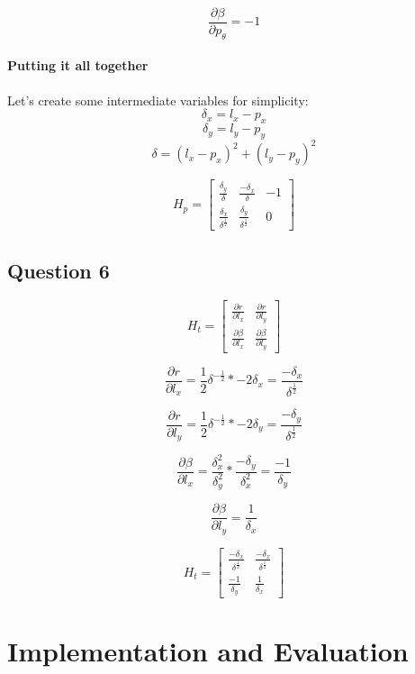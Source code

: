 \documentclass[12pt, a4paper]{article}
\begin{document}
$$\frac{\partial \beta}{\partial p_{\theta}} = -1$$

\paragraph{Putting it all together}

Let's create some intermediate variables for simplicity:
$$\delta_x = l_x - p_x$$
$$\delta_y = l_y - p_y$$
$$\delta = (l_x - p_x)^2 + (l_y - p_y)^2$$


$$H_p = 
\begin{bmatrix}
    \frac{\delta_y}{\delta} & \frac{-\delta_x}{\delta} & -1 \\
    \frac{\delta_x}{\delta^{\frac{1}{2}}} & \frac{\delta_y}{\delta^{\frac{1}{2}}}  & 0
    
\end{bmatrix}$$

\clearpage
\subsection{Question 6}

$$H_t = 
\begin{bmatrix}
    \frac{\partial r}{\partial l_x} & \frac{\partial r}{\partial l_y} \\
    \frac{\partial \beta}{\partial l_x} & \frac{\partial \beta}{\partial l_y}
\end{bmatrix}$$

$$\frac{\partial r}{\partial l_x} = \frac{1}{2} \delta^{-\frac{1}{2}} * -2\delta_x = \frac{-\delta_x}{\delta^{\frac{1}{2}}}$$

$$\frac{\partial r}{\partial l_y} = \frac{1}{2} \delta^{-\frac{1}{2}} * -2\delta_y = \frac{-\delta_y}{\delta^{\frac{1}{2}}}$$

$$\frac{\partial \beta}{\partial l_x} = \frac{\delta_x^2}{\delta_y^2} * \frac{-\delta_y}{\delta_x^2} = \frac{-1}{\delta_y}$$

$$\frac{\partial \beta}{\partial l_y} = \frac{1}{\delta_x}$$

$$H_t = 
\begin{bmatrix}
    \frac{-\delta_x}{\delta^{\frac{1}{2}}} & \frac{-\delta_x}{\delta^{\frac{1}{2}}} \\
    \frac{-1}{\delta_y} & \frac{1}{\delta_x}
\end{bmatrix}$$

\section{Implementation and Evaluation}
\end{document}
